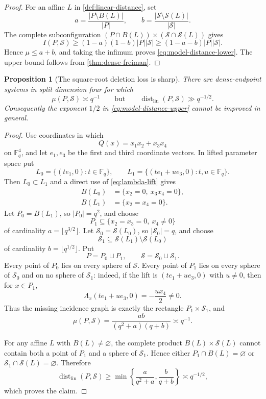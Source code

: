 \documentclass[11pt,letterpaper]{amsart}
\newtheorem{proposition}[proposition]{Proposition}
\theoremstyle{definition}
\theoremstyle{remark}
\newcommand{\1}{\mathbf 1}
\begin{document}
\begin{proof}
For an affine $L$ in \cref{def:linear-distance}, set
\[
 a=\frac{|P\setminus B(L)|}{|P|},
 \qquad
 b=\frac{|\mathcal S\setminus\mathcal S(L)|}{|\mathcal S|}.
\]
The complete subconfiguration $(P\cap B(L))\times(\mathcal S\cap\mathcal S(L))$ gives
\[
 I(P,\mathcal S)\ge(1-a)(1-b)|P||\mathcal S|
 \ge(1-a-b)|P||\mathcal S|.
\]
Hence $\mu\le a+b$, and taking the infimum proves \eqref{eq:model-distance-lower}.  The upper bound follows from \cref{thm:dense-freiman}.
\end{proof}

\begin{proposition}[The square-root deletion loss is sharp]\label{prop:dense-sqrt-sharp}
There are dense-endpoint systems in split dimension four for which
\[
 \mu(P,\mathcal S)\asymp q^{-1}
 \qquad\text{but}\qquad
 \operatorname{dist}_{\mathrm{lin}}(P,\mathcal S)\gg q^{-1/2}.
\]
Consequently the exponent $1/2$ in \eqref{eq:model-distance-upper} cannot be improved in general.
\end{proposition}

\begin{proof}
Use coordinates in which
\[
 Q(x)=x_1x_2+x_3x_4
\]
on $\mathbb F_q^4$, and let $e_1,e_3$ be the first and third coordinate vectors.  In lifted parameter space put
\[
 L_0=\{(te_1,0):t\in\mathbb F_q\},
 \qquad
 L_1=\{(te_1+ue_3,0):t,u\in\mathbb F_q\}.
\]
Then $L_0\subset L_1$ and a direct use of \eqref{eq:lambda-lift} gives
\begin{align*}
 B(L_0)&=\{x_2=0,\ x_3x_4=0\},\\
 B(L_1)&=\{x_2=x_4=0\}.
\end{align*}
Let $P_0=B(L_1)$, so $|P_0|=q^2$, and choose
\[
 P_1\subseteq\{x_2=x_3=0,\ x_4\ne0\}
\]
of cardinality $a=\lfloor q^{3/2}\rfloor$.  Let $\mathcal S_0=\mathcal S(L_0)$, so $|\mathcal S_0|=q$, and choose
\[
 \mathcal S_1\subseteq\mathcal S(L_1)\setminus\mathcal S(L_0)
\]
of cardinality $b=\lfloor q^{1/2}\rfloor$.  Put
\[
 P=P_0\sqcup P_1,
 \qquad
 \mathcal S=\mathcal S_0\sqcup\mathcal S_1.
\]
Every point of $P_0$ lies on every sphere of $\mathcal S$.  Every point of $P_1$ lies on every sphere of $\mathcal S_0$ and on no sphere of $\mathcal S_1$: indeed, if the lift is $(te_1+ue_3,0)$ with $u\ne0$, then for $x\in P_1$,
\[
 \Lambda_x(te_1+ue_3,0)=-\frac{u x_4}{2}\ne0.
\]
Thus the missing incidence graph is exactly the rectangle $P_1\times\mathcal S_1$, and
\[
 \mu(P,\mathcal S)
 =\frac{ab}{(q^2+a)(q+b)}\asymp q^{-1}.
\]

For any affine $L$ with $B(L)\ne\varnothing$, the complete product $B(L)\times\mathcal S(L)$ cannot contain both a point of $P_1$ and a sphere of $\mathcal S_1$.  Hence either $P_1\cap B(L)=\varnothing$ or $\mathcal S_1\cap\mathcal S(L)=\varnothing$.  Therefore
\[
 \operatorname{dist}_{\mathrm{lin}}(P,\mathcal S)
 \ge\min\left\{\frac a{q^2+a},\frac b{q+b}\right\}
 \asymp q^{-1/2},
\]
which proves the claim.
\end{proof}
\end{document}
